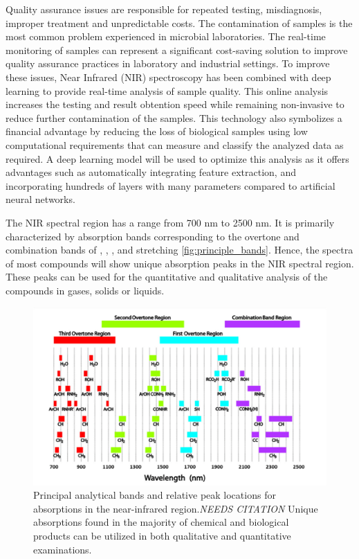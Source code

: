 \documentclass[12pt]{report}
\renewcommand{\cite}{\supercite}
\begin{document}
Quality assurance issues are responsible for repeated testing, misdiagnosis, improper treatment and unpredictable costs.\cite{CostPoorQualityrandoxlaboratories} The contamination of samples is the most common problem experienced in microbial laboratories. The real-time monitoring of samples can represent a significant cost-saving solution to improve quality assurance practices in laboratory and industrial settings.\cite{ContaminationMicrobiologicalLaboratoryendeshawabatenh2018} To improve these issues, Near Infrared (NIR) spectroscopy has been combined with deep learning to provide real-time analysis of sample quality. This online analysis increases the testing and result obtention speed while remaining non-invasive to reduce further contamination of the samples.\cite{SpeechRecognitionUsingalsobhani2021} This technology also symbolizes a financial advantage by reducing the loss of biological samples using low computational requirements that can measure and classify the analyzed data as required. A deep learning model will be used to optimize this analysis as it offers advantages such as automatically integrating feature extraction, and incorporating hundreds of layers with many parameters compared to artificial neural networks.\cite{DeepLearningNearinfraredmishra2022}

The NIR spectral region has a range from 700 nm to 2500 nm. It is primarily characterized by absorption bands corresponding to the overtone and combination bands of , , , and  stretching \autoref{fig:principle_bands}. Hence, the spectra of most compounds will show unique absorption peaks in the NIR spectral region. These peaks can be used for the quantitative and qualitative analysis of the compounds in gases, solids or liquids.

\begin{figure}[h]
    \centering
    \includegraphics[width=0.75\linewidth]{Images/principle_bands.png}
    \caption{Principal analytical bands and relative peak locations for absorptions in the near-infrared region.\emph{NEEDS CITATION} Unique absorptions found in the majority of chemical and biological products can be utilized in both qualitative and quantitative examinations.}
    \label{fig:principle_bands}
\end{figure}
\end{document}
